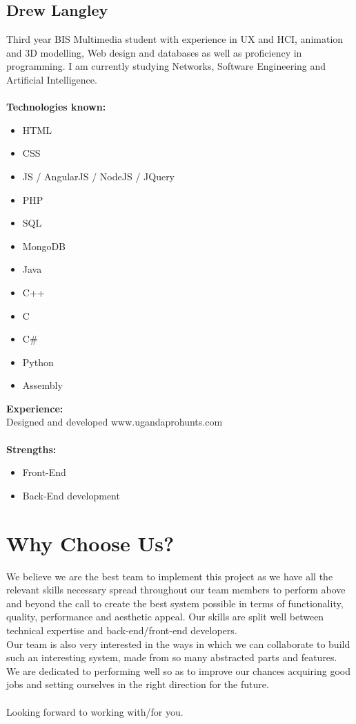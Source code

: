 \documentclass{article}
\begin{document}
\subsection {Drew Langley}
Third year BIS Multimedia student with experience in UX and HCI, animation and 3D modelling, Web design and databases as well as proficiency in programming. I am currently studying Networks, Software Engineering and Artificial Intelligence. \\ \\
\textbf{Technologies known:}
\begin{itemize}
	\item HTML
	\item CSS 
	\item JS / AngularJS / NodeJS / JQuery 
	\item PHP 
	\item SQL
	\item MongoDB
	\item Java 
	\item C++ 
	\item C 
	\item C\# 
	\item Python 
	\item Assembly
\end{itemize}
\textbf{Experience:} \\
Designed and developed www.ugandaprohunts.com
\\ \\
\textbf{Strengths:} 
\begin{itemize}
	\item Front-End
	\item Back-End development
\end{itemize}

\newpage
\section{Why Choose Us?}
	We believe we are the best team to implement this project as we have all the relevant skills necessary spread throughout our team members to perform above and beyond the call to create the best system possible in terms of functionality, quality, performance and aesthetic appeal. Our skills are split well between technical expertise and back-end/front-end developers.\\
	Our team is also very interested in the ways in which we can collaborate to build such an interesting system, made from so many abstracted parts and features.\\
	We are dedicated to performing well so as to improve our chances acquiring good jobs and setting ourselves in the right direction for the future.\\ \\
	
	
	Looking forward to working with/for you.
\end{document}
